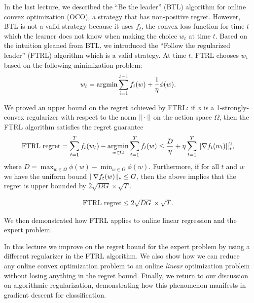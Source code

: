\setcounter{section}{0}


In the last lecture, we described the ``Be the leader'' (BTL) algorithm for online convex optimization (OCO), a strategy that has non-positive regret. However, BTL is not a valid strategy because it uses $f_t$, the convex loss function for time $t$ which the learner does not know when making the choice $w_t$ at time $t$. Based on the intuition gleaned from BTL, we introduced the ``Follow the regularized leader'' (FTRL) algorithm which is a valid strategy. At time $t$, FTRL chooses $w_t$ based on the following minimization problem:
\begin{align}
w_t = \operatorname*{\textup{argmin}} \sum_{i=1}^{t-1} f_i(w) + \frac{1}{\eta} \phi(w).
\end{align}

We proved an upper bound on the regret achieved by FTRL: if $\phi$ is a 1-strongly-convex regularizer with respect to the norm $\|\cdot\|$ on the action space $\Omega$, then the FTRL algorithm satisfies the regret guarantee
\begin{align}
\text{FTRL regret} = \sum_{t = 1}^T f_t(w_t) - \operatorname*{\textup{argmin}}_{w \in \Omega} \sum_{t = 1}^T f_t(w)  \leq \frac{D}{\eta} + \eta \sum_{t = 1}^T \|\nabla f_t(w_t)\|_*^2,
\end{align}
where $D = \max_{w \in \Omega} \phi(w) - \min_{w \in \Omega} \phi(w)$. Furthermore, if for all $t$ and $w$ we have the uniform bound $\|\nabla f_t(w)\|_* \leq G$, then the above implies that the regret is upper bounded by $2 \sqrt{D G} \times \sqrt{T}$. 

\begin{align}\label{lec17:eqn:ftrl-regret-ub}
\text{FTRL regret} \leq 2 \sqrt{D G} \times \sqrt{T}.
\end{align}

We then demonstrated how FTRL applies to online linear regression and the expert problem.

In this lecture we improve on the regret bound for the expert problem by using a different regularizer in the FTRL algorithm. We also show how we can reduce any online convex optimization problem to an online \textit{linear} optimization problem without losing anything in the regret bound. Finally, we return to our discussion on algorithmic regularization, demonstrating how this phenomenon manifests in gradient descent for classification.

